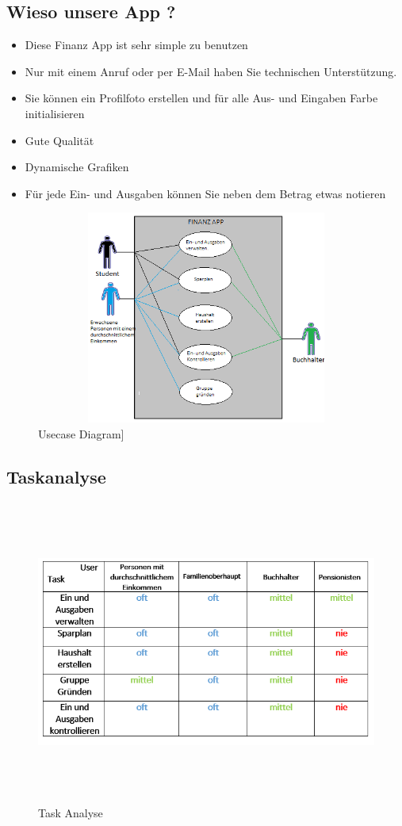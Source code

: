 \documentclass[runningheads,a4paper]{llncs}
\begin{document}
\subsection{Wieso unsere App ?}
\begin{itemize}
\item Diese Finanz App ist sehr simple zu benutzen
\item Nur mit einem Anruf oder per E-Mail haben Sie technischen Unterstützung.
\item Sie können ein Profilfoto erstellen und für alle Aus- und Eingaben Farbe initialisieren
\item Gute Qualität
\item Dynamische Grafiken
\item Für jede Ein- und Ausgaben können Sie neben dem Betrag etwas notieren
\end {itemize}


\begin{figure}
\centering
\includegraphics[height=7cm,width=15cm]{usecase}
\caption{Usecase Diagram]}
\end{figure}
\clearpage
                     

\subsection{Taskanalyse}

\begin{figure}
\centering
\includegraphics[height=10cm,width=13cm]{aufgabenanalyse}
\caption{Task Analyse}
\end{figure}
\clearpage
\end{document}
